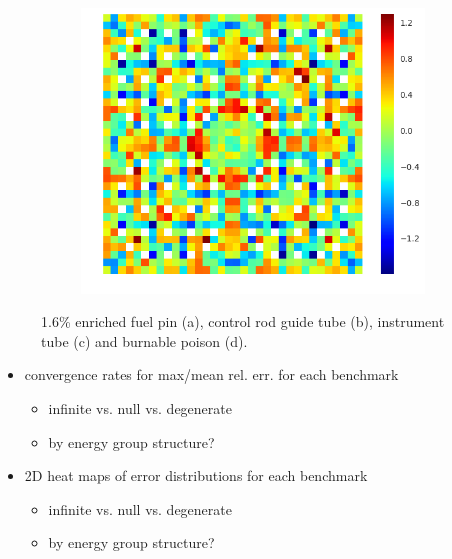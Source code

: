 \begin{figure}[h!]
\begin{subfigure}{.33\textwidth}
  \centering
  \includegraphics[width=\linewidth]{figures/quantification/2x2/degenerate-capt-err-70}
  \caption{}
  \label{fig:chap8-2x2-degenerate-capt-70}
\end{subfigure}
\caption[U-238 capture rate errors for a 2$\times$2 colorset]{1.6\% enriched fuel pin (a), control rod guide tube (b), instrument tube (c) and burnable poison (d).}
\label{fig:chap8-2x2-capt-err}
\end{figure}


\begin{itemize}[noitemsep]
  \item convergence rates for max/mean rel. err. for each benchmark
  \begin{itemize}[noitemsep]
    \item infinite vs. null vs. degenerate
    \item by energy group structure?
  \end{itemize}
  \item 2D heat maps of error distributions for each benchmark
  \begin{itemize}[noitemsep]
    \item infinite vs. null vs. degenerate
    \item by energy group structure?
  \end{itemize}
\end{itemize}

